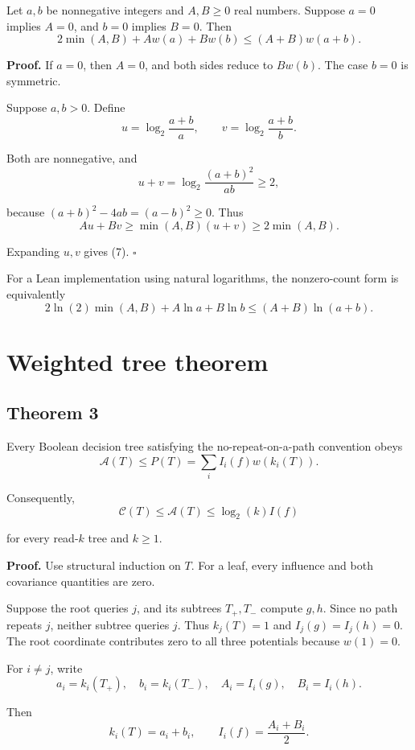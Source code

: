 \documentclass[
  american,
  11pt,
]{article}
\begin{document}
Let \(a,b\) be nonnegative integers and \(A,B\geq0\) real numbers.
Suppose \(a=0\) implies \(A=0\), and \(b=0\) implies \(B=0\). Then \[
2\min(A,B)+A w(a)+B w(b)
\leq(A+B)w(a+b).
\tag{7}
\]

\textbf{Proof.} If \(a=0\), then \(A=0\), and both sides reduce to
\(B w(b)\). The case \(b=0\) is symmetric.

Suppose \(a,b>0\). Define \[
u=\log_2\frac{a+b}{a},\qquad
v=\log_2\frac{a+b}{b}.
\]

Both are nonnegative, and \[
u+v=\log_2\frac{(a+b)^2}{ab}\geq2,
\]

because \((a+b)^2-4ab=(a-b)^2\geq0\). Thus \[
Au+Bv\geq\min(A,B)(u+v)\geq2\min(A,B).
\]

Expanding \(u,v\) gives (7). \(\square\)

For a Lean implementation using natural logarithms, the nonzero-count
form is equivalently \[
2\ln(2)\min(A,B)+A\ln a+B\ln b
\leq(A+B)\ln(a+b).
\]

\section{Weighted tree theorem}\label{weighted-tree-theorem}

\subsection*{Theorem 3}\label{theorem-3}

Every Boolean decision tree satisfying the no-repeat-on-a-path
convention obeys \[
\mathcal A(T)\leq P(T)=\sum_i I_i(f)w(k_i(T)).
\tag{8}
\]

Consequently, \[
\mathcal C(T)\leq\mathcal A(T)\leq\log_2(k)I(f)
\tag{9}
\]

for every read-\(k\) tree and \(k\geq1\).

\textbf{Proof.} Use structural induction on \(T\). For a leaf, every
influence and both covariance quantities are zero.

Suppose the root queries \(j\), and its subtrees \(T_+,T_-\) compute
\(g,h\). Since no path repeats \(j\), neither subtree queries \(j\).
Thus \(k_j(T)=1\) and \(I_j(g)=I_j(h)=0\). The root coordinate
contributes zero to all three potentials because \(w(1)=0\).

For \(i\ne j\), write \[
a_i=k_i(T_+),\quad b_i=k_i(T_-),\quad
A_i=I_i(g),\quad B_i=I_i(h).
\]

Then \[
k_i(T)=a_i+b_i,\qquad
I_i(f)=\frac{A_i+B_i}{2}.
\tag{10}
\]
\end{document}
